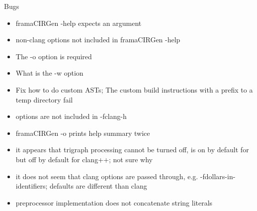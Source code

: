 \documentclass[web]{frama-c-book}
\begin{document}
Bugs
\begin{itemize}
\item framaCIRGen -help expects an argument
\item non-clang options not included in framaCIRGen -help
\item The -o option is required
\item What is the -w option
\item Fix how to do custom ASTs; The custom build instructions with a prefix to a temp directory fail
\item \irg options are not included in -fclang-h

\item framaCIRGen -o prints help summary twice
\item it appears that trigraph processing cannot be turned off, is on by default for \irg but off by default for clang++; not sure why
\item it does not seem that clang options are passed through, e.g. -fdollars-in-identifiers; \irg defaults are different than clang
\item preprocessor implementation does not concatenate string literals
\end{itemize}


\cleardoublepage
{}






\cleardoublepage
{}
\printindex
\end{document}
